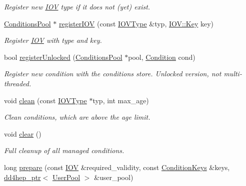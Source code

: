 \begin{DoxyCompactItemize}
\begin{DoxyCompactList}\small\item\em Register new \hyperlink{class_d_d4hep_1_1_i_o_v}{I\+OV} type if it does not (yet) exist. \end{DoxyCompactList}\item 
\hyperlink{class_d_d4hep_1_1_conditions_1_1_conditions_pool}{Conditions\+Pool} $\ast$ \hyperlink{class_d_d4hep_1_1_conditions_1_1_conditions_manager_a5be8e5c4facef3b9658b6e270c37c1b7}{register\+I\+OV} (const \hyperlink{class_d_d4hep_1_1_i_o_v_type}{I\+O\+V\+Type} \&typ, \hyperlink{class_d_d4hep_1_1_i_o_v_a07cb46dc875296dc9cccf4ff370104ae}{I\+O\+V\+::\+Key} key)
\begin{DoxyCompactList}\small\item\em Register \hyperlink{class_d_d4hep_1_1_i_o_v}{I\+OV} with type and key. \end{DoxyCompactList}\item 
bool \hyperlink{class_d_d4hep_1_1_conditions_1_1_conditions_manager_abd5482f92d8b86346c6fbd5865486075}{register\+Unlocked} (\hyperlink{class_d_d4hep_1_1_conditions_1_1_conditions_pool}{Conditions\+Pool} $\ast$pool, \hyperlink{class_d_d4hep_1_1_conditions_1_1_condition}{Condition} cond)
\begin{DoxyCompactList}\small\item\em Register new condition with the conditions store. Unlocked version, not multi-\/threaded. \end{DoxyCompactList}\item 
void \hyperlink{class_d_d4hep_1_1_conditions_1_1_conditions_manager_a0a737c0144c439c5fc5cc8c11fc6e909}{clean} (const \hyperlink{class_d_d4hep_1_1_i_o_v_type}{I\+O\+V\+Type} $\ast$typ, int max\+\_\+age)
\begin{DoxyCompactList}\small\item\em Clean conditions, which are above the age limit. \end{DoxyCompactList}\item 
void \hyperlink{class_d_d4hep_1_1_conditions_1_1_conditions_manager_af1a5f51d3f887ebee75eb32094d1ee3f}{clear} ()
\begin{DoxyCompactList}\small\item\em Full cleanup of all managed conditions. \end{DoxyCompactList}\item 
long \hyperlink{class_d_d4hep_1_1_conditions_1_1_conditions_manager_a3f702bb3db03a4e7b947e8ed591f138b}{prepare} (const \hyperlink{class_d_d4hep_1_1_i_o_v}{I\+OV} \&required\+\_\+validity, const \hyperlink{class_d_d4hep_1_1_conditions_1_1_conditions_manager_a8dd76f9acef2c8d3b7970e266fe7eff6}{Condition\+Keys} \&keys, \hyperlink{class_d_d4hep_1_1dd4hep__ptr}{dd4hep\+\_\+ptr}$<$ \hyperlink{class_d_d4hep_1_1_conditions_1_1_user_pool}{User\+Pool} $>$ \&user\+\_\+pool)

\end{DoxyCompactItemize}
